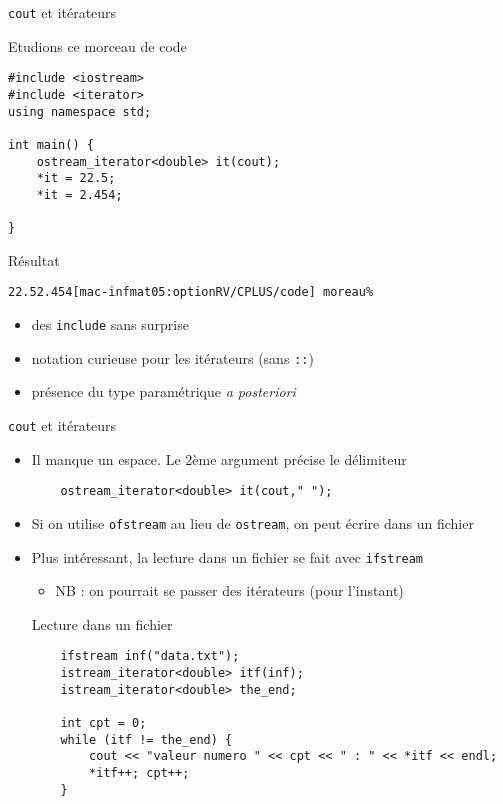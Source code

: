\begin{frame}[fragile]{\texttt{cout} et itérateurs}
\begin{codeblock}{Etudions ce morceau de code}
\begin{lstlisting}
#include <iostream>
#include <iterator>
using namespace std;

int main() {
    ostream_iterator<double> it(cout);
    *it = 22.5;
    *it = 2.454;

}
\end{lstlisting}
\end{codeblock}
\begin{block}{Résultat}
{\tiny
\begin{verbatim}
22.52.454[mac-infmat05:optionRV/CPLUS/code] moreau%
\end{verbatim}
}
\end{block}
\begin{itemize}
\item des \texttt{include} sans surprise
\item notation curieuse pour les itérateurs (sans \verb|::|)
\item présence du type paramétrique \textit{a posteriori}
\end{itemize}
\end{frame}

\begin{frame}[fragile]{\texttt{cout} et itérateurs}
\begin{itemize}
\item Il manque un espace. Le 2ème argument précise le délimiteur
\begin{lstlisting}
    ostream_iterator<double> it(cout," ");
\end{lstlisting}
\item Si on utilise \verb|ofstream| au lieu de \verb|ostream|, on peut écrire dans un fichier
\item Plus intéressant, la lecture dans un fichier se fait avec \verb|ifstream|
\begin{itemize}
\item NB : on pourrait se passer des itérateurs (pour l'instant)
\end{itemize}
\begin{codeblock}{Lecture dans un fichier}
\begin{lstlisting}
    ifstream inf("data.txt");
    istream_iterator<double> itf(inf);
    istream_iterator<double> the_end;

    int cpt = 0;
    while (itf != the_end) {
        cout << "valeur numero " << cpt << " : " << *itf << endl;
        *itf++; cpt++;
    }
\end{lstlisting}
\end{codeblock}
\end{itemize}
\end{frame}

